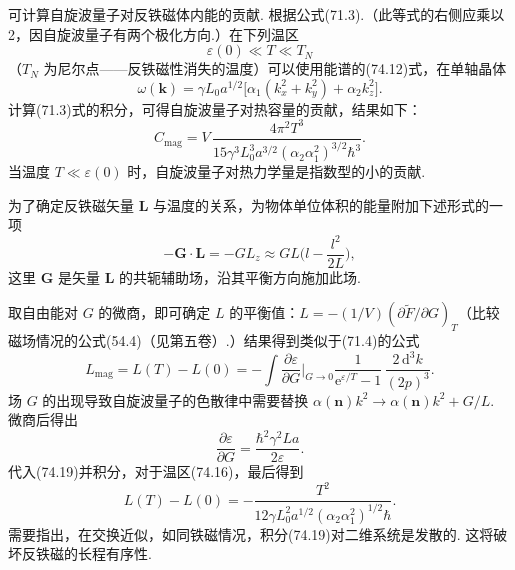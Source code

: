 可计算自旋波量子对反铁磁体内能的贡献. 根据公式(71.3).（此等式的右侧应乘以 2，因自旋波量子有两个极化方向.）在下列温区
\begin{equation}
\varepsilon(0)\ll T\ll T_N
\end{equation}
（$T_N$ 为尼尔点——反铁磁性消失的温度）可以使用能谱的(74.12)式，在单轴晶体
\begin{equation*}
\omega(\bm{k})=\gamma L_0a^{1/2}\bigl[\alpha_1(k_x^2+k_y^2)+\alpha_2k_z^2\bigr].
\end{equation*}
计算(71.3)式的积分，可得自旋波量子对热容量的贡献，结果如下：
\begin{equation}
C_{\mathrm{mag}}=V\,\frac{4\pi^2T^3}
{15\gamma^3L_0^3a^{3/2}(\alpha_2\alpha_1^2)^{3/2}\hbar^3}.
\end{equation}
当温度 $T\ll\varepsilon(0)$ 时，自旋波量子对热力学量是指数型的小的贡献.

为了确定反铁磁矢量 $\bm{L}$ 与温度的关系，为物体单位体积的能量附加下述形式的一项
\begin{equation}
-\bm{G}\cdot\bm{L}=-GL_z\approx GL\biggl(l-\frac{l^2}{2L}\biggr),
\end{equation}
这里 $\bm{G}$ 是矢量 $\bm{L}$ 的共轭辅助场，沿其平衡方向施加此场.

取自由能对 $G$ 的微商，即可确定 $L$ 的平衡值：$L=-(1/V)(\partial\tilde{F}/\partial G)_T$（比较磁场情况的公式(54.4)（见第五卷）.）结果得到类似于(71.4)的公式
\begin{equation}
L_{\mathrm{mag}}=L(T)-L(0)=-\int\frac{\partial\varepsilon}{\partial G}
\bigg|_{G\to0}\frac{1}{\mathrm{e}^{\varepsilon/T}-1}\,
\frac{2\,\mathrm{d}^3k}{(2p)^3}.
\end{equation}
场 $G$ 的出现导致自旋波量子的色散律中需要替换 $\alpha(\bm{n})k^2\to\alpha(\bm{n})k^2+G/L$. 微商后得出
\begin{equation*}
\frac{\partial\varepsilon}{\partial G}=\frac{\hbar^2\gamma^2La}{2\varepsilon}.
\end{equation*}
代入(74.19)并积分，对于温区(74.16)，最后得到
\begin{equation*}
L(T)-L(0)=-\frac{T^2}{12\gamma L_0^2a^{1/2}(\alpha_2\alpha_1^2)^{1/2}\hbar}.
\end{equation*}
需要指出，在交换近似，如同铁磁情况，积分(74.19)对二维系统是发散的. 这将破坏反铁磁的长程有序性.

